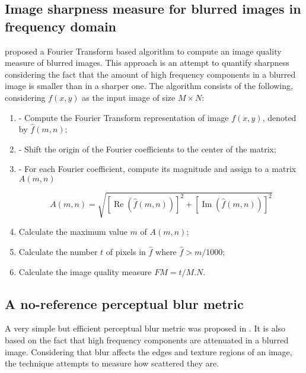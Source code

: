 \subsection{Image sharpness measure for blurred images in frequency domain}

 proposed a Fourier Transform based algorithm to compute an image quality measure of blurred images. This approach is an attempt to quantify sharpness considering the fact that the amount of high frequency components in a blurred image is smaller than in a sharper one. The algorithm consists of the following, considering $f(x,y)$ as the input image of size $M \times N$:

\begin{enumerate}[label=\Roman*.]
    \item - Compute the Fourier Transform representation of image $f(x,y)$, denoted by $\hat{f}(m,n)$;
    
    \item - Shift the origin of the Fourier coefficients to the center of the matrix;
    
    \item - For each Fourier coefficient, compute its magnitude and assign to a matrix $A(m,n)$
    
    \begin{equation*}
        A(m,n) = \sqrt{
            [\operatorname{Re}{(\hat{f}(m,n))}]^{2}
            + [\operatorname{Im}{(\hat{f}(m,n))}]^{2}
          }
    \end{equation*}
    
    \item  Calculate the maximum value $m$ of $A(m,n)$; 
    
    \item Calculate the number $t$ of pixels in $\hat{f}$ where $\hat{f} > m /1000$;
    
    \item Calculate the image quality measure $FM = t /M.N$.
\end{enumerate}

\subsection{A no-reference perceptual blur metric}

A very simple but efficient perceptual blur metric was proposed in
\cite{marziliano2002noreference}. It is also based on the fact that high frequency components are attenuated in a blurred image. Considering that blur affects the edges and texture regions of an image, the technique attempts to measure how scattered they are. 

